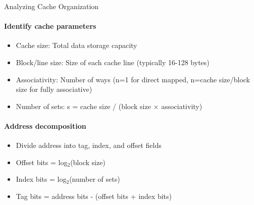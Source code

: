 \begin{KR}{Analyzing Cache Organization}
\paragraph{Identify cache parameters}
\begin{itemize}
    \item Cache size: Total data storage capacity
    \item Block/line size: Size of each cache line (typically 16-128 bytes)
    \item Associativity: Number of ways (n=1 for direct mapped, n=cache size/block size for fully associative)
    \item Number of sets: s = cache size / (block size × associativity)
\end{itemize}

\paragraph{Address decomposition}
\begin{itemize}
    \item Divide address into tag, index, and offset fields
    \item Offset bits = log$_2$(block size)
    \item Index bits = log$_2$(number of sets)
    \item Tag bits = address bits - (offset bits + index bits)
\end{itemize}


\end{KR}
